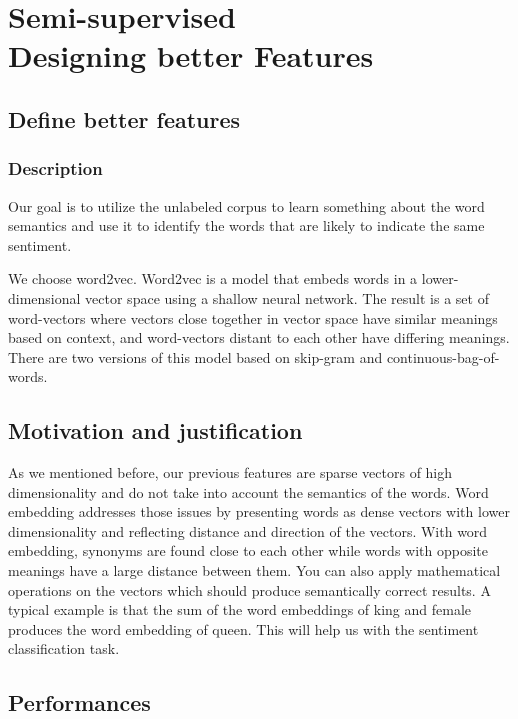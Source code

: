 \section{\textbf{Semi-supervised\\ Designing better Features}}

\subsection{\textbf{Define better features}}

\subsubsection{Description}

Our goal is to utilize the unlabeled corpus to learn something about the word semantics and use it to identify the words that are likely to indicate the same sentiment.

We choose word2vec. Word2vec is a model that embeds words in a lower-dimensional vector space using a shallow neural network. The result is a set of word-vectors where vectors close together in vector space have similar meanings based on context, and word-vectors distant to each other have differing meanings. There are two versions of this model based on skip-gram and continuous-bag-of-words. 

\subsection{Motivation and justification}

As we mentioned before, our previous features are sparse vectors of high dimensionality and do not take into account the semantics of the words. Word embedding addresses those issues by presenting words as dense vectors with lower dimensionality and reflecting distance and direction of the vectors. With word embedding, synonyms are found close to each other while words with opposite meanings have a large distance between them. You can also apply mathematical operations on the vectors which should produce semantically correct results. A typical example is that the sum of the word embeddings of king and female produces the word embedding of queen. This will help us with the sentiment classification task.

\subsection{\textbf{Performances}}

